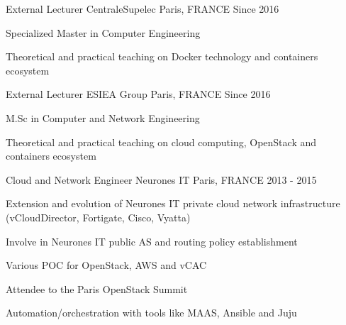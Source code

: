 \begin{cventries}
  \cventry
    {External Lecturer} %
    {CentraleSupelec}
    {Paris, FRANCE} %
    {Since 2016} %
    {
      \begin{cvitems} %
        \item {Specialized Master in Computer Engineering}
        \item {Theoretical and practical teaching on Docker technology and
          containers ecosystem}
      \end{cvitems}
    }

  \cventry
    {External Lecturer} %
    {ESIEA Group}
    {Paris, FRANCE} %
    {Since 2016} %
    {
      \begin{cvitems} %
      \item{M.Sc in Computer and Network Engineering} %
        \item {Theoretical and practical teaching on cloud computing, OpenStack
          and containers ecosystem}
      \end{cvitems}
    }

  \cventry
    {Cloud and Network Engineer}
    {Neurones IT} %
    {Paris, FRANCE} %
    {2013 - 2015} %
    {
      \begin{cvitems} %
        \item {Extension and evolution of Neurones IT private cloud
          network infrastructure (vCloudDirector, Fortigate, Cisco, Vyatta)}
        \item {Involve in Neurones IT public AS and routing policy
          establishment}
        \item {Various POC for OpenStack, AWS and vCAC}
        \item {Attendee to the Paris OpenStack Summit}
        \item {Automation/orchestration with tools like MAAS, Ansible and Juju}
      \end{cvitems}
    }

\end{cventries}
